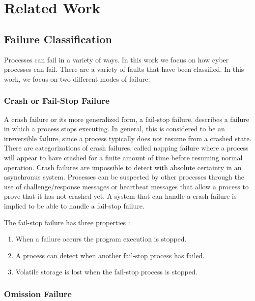 \chapter{Related Work}

\section{Failure Classification}

Processes can fail in a variety of ways. In this work we focus on how cyber processes can fail. There are a variety of faults that have been classified. In this work,
we focus on two different modes of failure:

\subsection{Crash or Fail-Stop Failure}

A crash failure or its more generalized form, a fail-stop failure, describes a failure in which a process stops executing. In general, this is considered to be an
irreversible failure, since a process typically does not resume from a crashed state. There are categorizations of crash failures, called napping failure
where a process will appear to have crashed for a finite amount of time before resuming normal operation. Crash failures are impossible to detect with absolute
certainty in an asynchronus system. Processes can be suspected by other processes through the use of challenge/response messages or heartbeat messages that allow
a process to prove that it has not crashed yet. A system that can handle a crash failure is implied to be able to handle a fail-stop failure.\cite{DISTRIBUTED}

The fail-stop failure has three properties \cite{DISTRIBUTED}:

\begin{enumerate}
\item When a failure occurs the program execution is stopped.
\item A process can detect when another fail-stop process has failed.
\item Volatile storage is lost when the fail-stop process is stopped.
\end{enumerate}

\subsection{Omission Failure}

